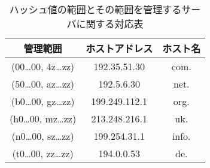 \begin{table}[htb]
 \centering
  \begin{tabular}{ccc}
    \toprule
    管理範囲 & ホストアドレス & ホスト名 \\
    \midrule
    (00…00, 4z…zz) & 192.35.51.30 & com.  \\
    (50…00, az…zz) & 192.5.6.30 & net. \\
    (b0…00, gz…zz) & 199.249.112.1 & org. \\
    (h0…00, mz…zz) & 213.248.216.1 & uk. \\
    (n0…00, sz…zz) & 199.254.31.1 & info. \\
    (t0…00, zz…zz) & 194.0.0.53 & de. \\
    \bottomrule
  \end{tabular}
 \caption{ハッシュ値の範囲とその範囲を管理するサーバに関する対応表}
 \label{tab:hash-management}
\end{table}
